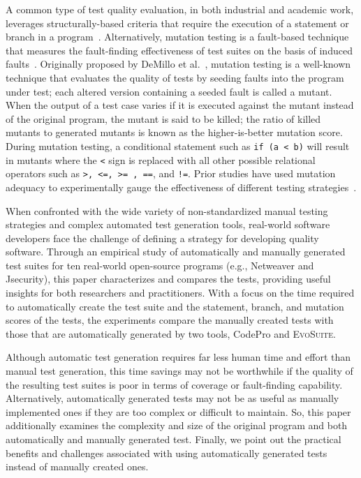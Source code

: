 
A common type of test quality evaluation, in both industrial and academic work, leverages structurally-based criteria that require the execution of a statement or branch in a program~\cite{weyuker1988evaluation}.  Alternatively, mutation testing is a fault-based technique that measures the fault-finding effectiveness of test suites on the basis of induced faults~\cite{demillo1978hints, hamlet1977testing}.  Originally proposed by DeMillo et al.~\cite{demillo1978hints}, mutation testing is a well-known technique that evaluates the quality of tests by seeding faults into the program under test; each altered version containing a seeded fault is called a mutant. When the output of a test case varies if it is executed against the mutant instead of the original program, the mutant is said to be killed; the ratio of killed mutants to generated mutants is known as the higher-is-better mutation score. During mutation testing, a conditional statement such as \texttt{if (a < b)} will result in mutants where the \texttt{<} sign is replaced with all other possible relational operators such as \texttt{>, <=, >= , ==}, and \texttt{!=}. Prior studies have used mutation adequacy to experimentally gauge the effectiveness of different testing strategies~\cite{andrews2005mutation,andrews2006,do2006,just2014}.  


When confronted with the wide variety of non-standardized manual testing strategies and complex automated test generation tools, real-world software developers face the challenge of defining a strategy for developing quality software.  Through an empirical study of automatically and manually generated test suites for ten real-world open-source programs (e.g., Netweaver and Jsecurity), this paper characterizes and compares the tests, providing useful insights for both researchers and practitioners. With a focus on the time required to automatically create the test suite and the statement, branch, and mutation scores of the tests, the experiments compare the manually created tests with those that are automatically generated by two tools, CodePro and \textsc{EvoSuite}.  


Although automatic test generation requires far less human time and effort than manual test generation, this time savings may not be worthwhile if the quality of the resulting test suites is poor in terms of coverage or fault-finding capability.  Alternatively, automatically generated tests may not be as useful as manually implemented ones if they are too complex or difficult to maintain.  So, this paper additionally examines the complexity and size of the original program and both automatically and manually generated test.  Finally, we point out the practical benefits and challenges associated with using automatically generated tests instead of manually created ones.

